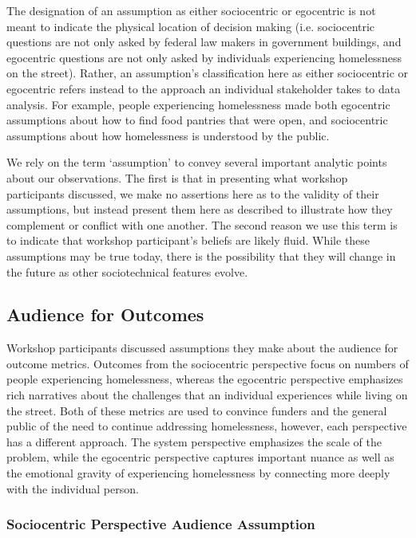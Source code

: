 The designation of an assumption as either sociocentric or egocentric is not meant to indicate the physical location of decision making (i.e. sociocentric questions are not only asked by federal law makers in government buildings, and egocentric questions are not only asked by individuals experiencing homelessness on the street). Rather, an assumption's classification here as either sociocentric or egocentric refers instead to the approach an individual stakeholder takes to data analysis. For example, people experiencing homelessness made both egocentric assumptions about how to find food pantries that were open, and sociocentric assumptions about how homelessness is understood by the public.

We rely on the term `assumption' to convey several important analytic points about our observations. The first is that in presenting what workshop participants discussed, we make no assertions here as to the validity of their assumptions, but instead present them here as described to illustrate how they complement or conflict with one another. The second reason we use this term is to indicate that workshop participant's beliefs are likely fluid. While these assumptions may be true today, there is the possibility that they will change in the future as other sociotechnical features evolve.


\subsection{Audience for Outcomes}
Workshop participants discussed assumptions they make about the audience for outcome metrics. Outcomes from the sociocentric perspective focus on numbers of people experiencing homelessness, whereas the egocentric perspective emphasizes rich narratives about the challenges that an individual experiences while living on the street. Both of these metrics are used to convince funders and the general public of the need to continue addressing homelessness, however, each perspective has a different approach. The system perspective emphasizes the scale of the problem, while the egocentric perspective captures important nuance as well as the emotional gravity of experiencing homelessness by connecting more deeply with the individual person.

\subsubsection{Sociocentric Perspective Audience Assumption}


